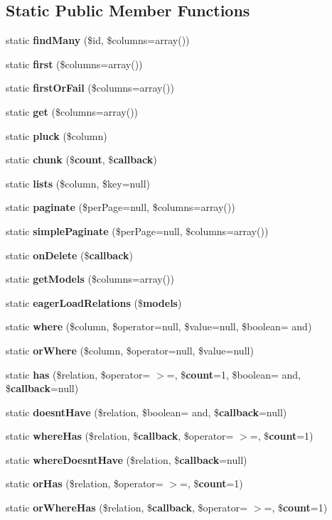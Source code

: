 \subsection*{Static Public Member Functions}
\begin{DoxyCompactItemize}
\item 
static {\bf find\+Many} (\$id, \$columns=array())
\item 
static {\bf first} (\$columns=array())
\item 
static {\bf first\+Or\+Fail} (\$columns=array())
\item 
static {\bf get} (\$columns=array())
\item 
static {\bf pluck} (\$column)
\item 
static {\bf chunk} (\${\bf count}, \${\bf callback})
\item 
static {\bf lists} (\$column, \$key=null)
\item 
static {\bf paginate} (\$per\+Page=null, \$columns=array())
\item 
static {\bf simple\+Paginate} (\$per\+Page=null, \$columns=array())
\item 
static {\bf on\+Delete} (\${\bf callback})
\item 
static {\bf get\+Models} (\$columns=array())
\item 
static {\bf eager\+Load\+Relations} (\${\bf models})
\item 
static {\bf where} (\$column, \$operator=null, \$value=null, \$boolean= \textquotesingle{}and\textquotesingle{})
\item 
static {\bf or\+Where} (\$column, \$operator=null, \$value=null)
\item 
static {\bf has} (\$relation, \$operator= \textquotesingle{}$>$=\textquotesingle{}, \${\bf count}=1, \$boolean= \textquotesingle{}and\textquotesingle{}, \${\bf callback}=null)
\item 
static {\bf doesnt\+Have} (\$relation, \$boolean= \textquotesingle{}and\textquotesingle{}, \${\bf callback}=null)
\item 
static {\bf where\+Has} (\$relation, \${\bf callback}, \$operator= \textquotesingle{}$>$=\textquotesingle{}, \${\bf count}=1)
\item 
static {\bf where\+Doesnt\+Have} (\$relation, \${\bf callback}=null)
\item 
static {\bf or\+Has} (\$relation, \$operator= \textquotesingle{}$>$=\textquotesingle{}, \${\bf count}=1)
\item 
static {\bf or\+Where\+Has} (\$relation, \${\bf callback}, \$operator= \textquotesingle{}$>$=\textquotesingle{}, \${\bf count}=1)

\end{DoxyCompactItemize}
